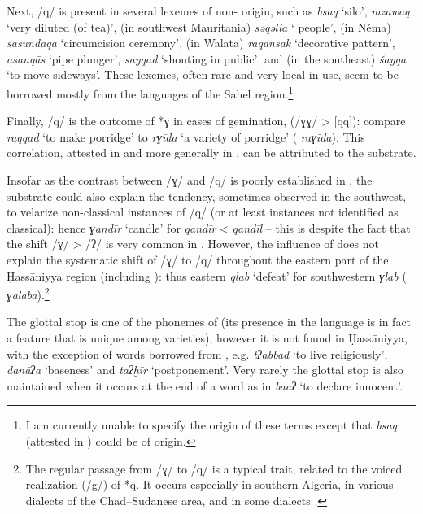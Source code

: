 \documentclass[output=paper]{langsci/langscibook}
\begin{document}
Next, /q/ is present in several lexemes of non- origin, such as \textit{bsaq} ‘silo’, \textit{mzaw{\R}aq} ‘very diluted (of tea)’, (in southwest Mauritania) \textit{sə{\R}qəlla} ‘ people’, (in Néma) \textit{sasundaqa} ‘circumcision ceremony’, (in Walata) \textit{raqansak} ‘decorative pattern’, \textit{asanqās} ‘pipe plunger’, \textit{sayqad} ‘shouting in public’, and (in the southeast) \textit{šayqa} ‘to move sideways’. These lexemes, often rare and very local in use, seem to be borrowed mostly from the languages of the Sahel region.\footnote{I am currently unable to specify the origin of these terms except that \textit{bsaq} (attested in ) could be of  origin.}

Finally, /q/ is the outcome of *ɣ in cases of gemination, (/ɣɣ/ > [qq]): compare \textit{raqqad} ‘to make porridge’ to \textit{rɣīda} ‘a variety of porridge’ ( \textit{raɣīda}). This correlation, attested in  and more generally in , can be attributed to the {substrate}.

Insofar as the contrast between /ɣ/ and /q/ is poorly established in , the {substrate} could also explain the tendency, sometimes observed in the southwest, to velarize non-classical instances of /q/ (or at least instances not identified as classical): hence \textit{ɣandīr} ‘candle’ for \textit{qandīr} <  \textit{qandīl} – this is despite the fact that the shift /ɣ/ > /ʔ/ is very common in . However, the influence of  does not explain the systematic shift of /ɣ/ to /q/ throughout the eastern part of the Ḥassāniyya region (including ): thus eastern \textit{qlab} ‘defeat’ for southwestern \textit{ɣlab} ( \textit{ɣalaba}).\footnote{The regular passage from /ɣ/ to /q/ is a typical  trait, related to the voiced realization (/g/) of *q. It occurs especially in southern Algeria, in various dialects of the Chad–{Sudanese} area, and in some  dialects \citep[72]{Cantineau1960book}.}

The glottal stop is one of the phonemes of  (its presence in the language is in fact a feature that is unique among  varieties), however it is not found in Ḥassāniyya, with the exception of words borrowed from  , e.g. \textit{tʔabbad} ‘to live religiously’, \textit{danāʔa} ‘baseness’ and \textit{taʔḫīr} ‘postponement’. Very rarely the glottal stop is also maintained when it occurs at the end of a word as in \textit{ba{\R}{\R}aʔ} ‘to declare innocent’.
\end{document}
